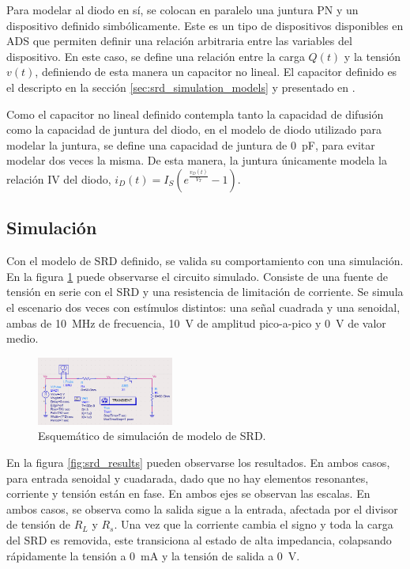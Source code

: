 Para modelar al diodo en sí, se colocan en paralelo una juntura PN y un
dispositivo definido simbólicamente. Este es un tipo de dispositivos disponibles
en ADS que permiten definir una relación arbitraria entre las variables del
dispositivo. En este caso, se define una relación entre la carga $Q(t)$ y la
tensión $v(t)$, definiendo de esta manera un capacitor no lineal. El capacitor
definido es el descripto en la sección \ref{sec:srd_simulation_models} y
presentado en \cite{zhang1995}.

Como el capacitor no lineal definido contempla tanto la capacidad de difusión
como la capacidad de juntura del diodo, en el modelo de diodo utilizado para
modelar la juntura, se define una capacidad de juntura de \qty{0}{\pico\farad},
para evitar modelar dos veces la misma. De esta manera, la juntura únicamente
modela la relación IV del diodo, $i_D(t) = I_S \left(
e^{\frac{v_D(t)}{V_T}}-1\right)$.

\subsection{Simulación}

Con el modelo de SRD definido, se valida su comportamiento con una simulación.
En la figura \ref{fig:srd_validation_schematic} puede observarse el circuito
simulado. Consiste de una fuente de tensión en serie con el SRD y una
resistencia de limitación de corriente. Se simula el escenario dos veces con
estímulos distintos: una señal cuadrada y una senoidal, ambas de
\qty{10}{\mega\hertz} de frecuencia, \qty{10}{\volt} de amplitud pico-a-pico y
\qty{0}{\volt} de valor medio.

\begin{figure}[t]
  \centering
    \includegraphics[width=0.4\textwidth]{images/srd_validation_schematic.jpg}
    \caption{Esquemático de simulación de modelo de SRD.}
    \label{fig:srd_validation_schematic}
\end{figure}

En la figura \ref{fig:srd_results} pueden observarse los resultados. En ambos
casos, para entrada senoidal y cuadarada, dado que no hay elementos resonantes,
corriente y tensión están en fase. En ambos ejes se observan las escalas. En
ambos casos, se observa como la salida sigue a la entrada, afectada por el
divisor de tensión de $R_L$ y $R_s$. Una vez que la corriente cambia el signo y
toda la carga del SRD es removida, este transiciona al estado de alta
impedancia, colapsando rápidamente la tensión a \qty{0}{\milli\ampere} y la
tensión de salida a \qty{0}{\volt}.

